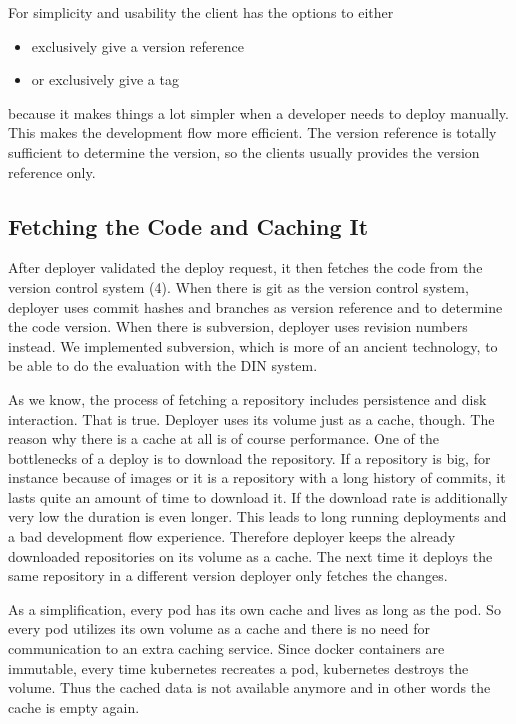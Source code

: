 For simplicity and usability the client has the options to either
\begin{itemize}
    \item exclusively give a version reference
    \item or exclusively give a tag
\end{itemize}
because it makes things a lot simpler when a developer needs to deploy
manually. This makes the development flow more efficient. The version reference is totally
sufficient to determine the version, so the clients usually provides the version reference
only.

\subsection{Fetching the Code and Caching It}

After deployer validated the deploy request, it then fetches the code from the version
control system (4). When there is git as the version control system, deployer uses commit
hashes and branches as version reference and to determine the code version. When there is
subversion, deployer uses revision numbers instead. We implemented subversion, which is
more of an ancient technology, to be able to do the evaluation with the DIN system.

As we know, the process of fetching a repository includes persistence and disk
interaction. That is true. Deployer uses its volume just as a cache, though. The reason
why there is a cache at all is of course performance. One of the bottlenecks of a deploy
is to download the repository. If a repository is big, for instance because of images or
it is a repository with a long history of commits, it lasts quite an amount of time to
download it. If the download rate is additionally very low the duration is even
longer. This leads to long running deployments and a bad development flow
experience. Therefore deployer keeps the already downloaded repositories on its volume as
a cache. The next time it deploys the same repository in a different version deployer only
fetches the changes.

As a simplification, every pod has its own cache and lives as long as the pod. So every
pod utilizes its own volume as a cache and there is no need for communication to an extra
caching service. Since docker containers are immutable, every time kubernetes recreates a
pod, kubernetes destroys the volume. Thus the cached data is not available anymore and in
other words the cache is empty again.

